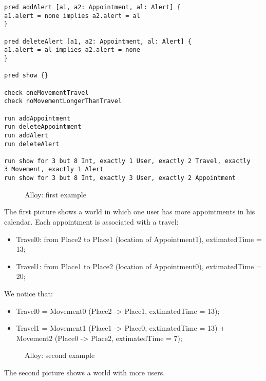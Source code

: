 \begin{lstlisting}
pred addAlert [a1, a2: Appointment, al: Alert] {
a1.alert = none implies a2.alert = al
}

pred deleteAlert [a1, a2: Appointment, al: Alert] {
a1.alert = al implies a2.alert = none
}

pred show {}

check oneMovementTravel
check noMovementLongerThanTravel

run addAppointment
run deleteAppointment
run addAlert
run deleteAlert

run show for 3 but 8 Int, exactly 1 User, exactly 2 Travel, exactly 
3 Movement, exactly 1 Alert
run show for 3 but 8 Int, exactly 3 User, exactly 2 Appointment

\end{lstlisting}
\clearpage

\begin{figure}[!h]
	\centering
	\caption{Alloy: first example}
\end{figure}

The first picture shows a world in which one user has more appointments in his calendar. Each appointment is associated with a travel:
\begin{itemize}
	\item Travel0: from Place2 to Place1 (location of Appointment1), extimatedTime = 13;
	\item Travel1: from Place1 to Place2 (location of Appointment0), extimatedTime = 20;
\end{itemize}

We notice that:
\begin{itemize}
	\item Travel0 = Movement0 (Place2 -> Place1, extimatedTime = 13);
	\item Travel1 = Movement1 (Place1 -> Place0, extimatedTime = 13) + Movement2 (Place0 -> Place2, extimatedTime = 7);
\end{itemize}

\begin{figure}[!h]
	\centering
	\caption{Alloy: second example}
\end{figure}
The second picture shows a world with more users.
